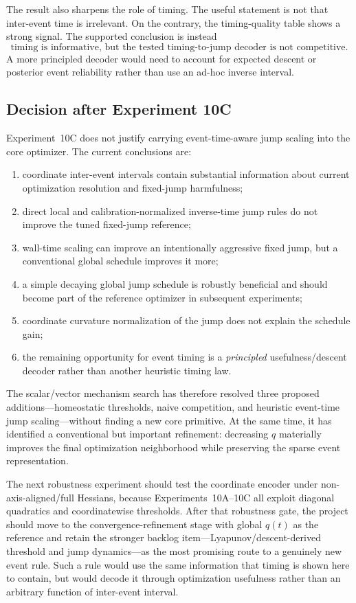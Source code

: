 The result also sharpens the role of timing. The useful statement is not that inter-event time is irrelevant. On the contrary, the timing-quality table shows a strong signal. The supported conclusion is instead
\begin{equation}
  \boxed{\text{timing is informative, but the tested timing-to-jump decoder is not competitive.}}
\end{equation}
A more principled decoder would need to account for expected descent or posterior event reliability rather than use an ad-hoc inverse interval.

\subsection{Decision after Experiment 10C}

Experiment~10C does not justify carrying event-time-aware jump scaling into the core optimizer. The current conclusions are:
\begin{enumerate}
  \item coordinate inter-event intervals contain substantial information about current optimization resolution and fixed-jump harmfulness;
  \item direct local and calibration-normalized inverse-time jump rules do not improve the tuned fixed-jump reference;
  \item wall-time scaling can improve an intentionally aggressive fixed jump, but a conventional global schedule improves it more;
  \item a simple decaying global jump schedule is robustly beneficial and should become part of the reference optimizer in subsequent experiments;
  \item coordinate curvature normalization of the jump does not explain the schedule gain;
  \item the remaining opportunity for event timing is a \emph{principled} usefulness/descent decoder rather than another heuristic timing law.
\end{enumerate}

The scalar/vector mechanism search has therefore resolved three proposed additions---homeostatic thresholds, naive competition, and heuristic event-time jump scaling---without finding a new core primitive. At the same time, it has identified a conventional but important refinement: decreasing $q$ materially improves the final optimization neighborhood while preserving the sparse event representation.

The next robustness experiment should test the coordinate encoder under non-axis-aligned/full Hessians, because Experiments~10A--10C all exploit diagonal quadratics and coordinatewise thresholds. After that robustness gate, the project should move to the convergence-refinement stage with global $q(t)$ as the reference and retain the stronger backlog item---Lyapunov/descent-derived threshold and jump dynamics---as the most promising route to a genuinely new event rule. Such a rule would use the same information that timing is shown here to contain, but would decode it through optimization usefulness rather than an arbitrary function of inter-event interval.
